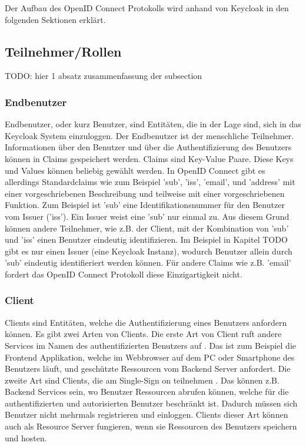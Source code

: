 Der Aufbau des OpenID Connect Protokolls wird anhand von Keycloak in den folgenden Sektionen erklärt.

\subsection{Teilnehmer/Rollen}

TODO: hier 1 absatz zusammenfassung der subsection

\subsubsection{Endbenutzer} \label{EB_End-Benutzer}

Endbenutzer, oder kurz Benutzer, sind Entitäten, die in der Lage sind, sich in das Keycloak System einzuloggen. Der Endbenutzer ist der menschliche Teilnehmer. Informationen über den Benutzer und über die Authentifizierung des Benutzers können in Claims gespeichert werden. Claims sind Key-Value Paare. Diese Keys und Values können beliebig gewählt werden. In OpenID Connect gibt es allerdings Standardclaims wie zum Beispiel 'sub', 'iss', 'email', und 'address' mit einer vorgeschriebenen Beschreibung und teilweise mit einer vorgeschriebenen Funktion. Zum Beispiel ist 'sub' eine Identifikationsnummer für den Benutzer vom Issuer ('iss'). Ein Issuer weist eine 'sub' nur einmal zu. Aus diesem Grund können andere Teilnehmer, wie z.B. der Client, mit der Kombination von 'sub' und 'iss' einen Benutzer eindeutig identifizieren. Im Beispiel in Kapitel TODO gibt es nur einen Issuer (eine Keycloak Instanz), wodurch Benutzer allein durch 'sub' eindeutig identifieriert werden können. Für andere Claims wie z.B. 'email' fordert das OpenID Connect Protokoll diese Einzigartigkeit nicht.

\subsubsection{Client} \label{EB_Client}

Clients sind Entitäten, welche die Authentifizierung eines Benutzers anfordern können. Es gibt zwei Arten von Clients. Die erste Art von Client ruft andere Services im Namen des authentifizierten Benutzers auf \cite{EB2} \cite{EB3}. Das ist zum Beispiel die Frontend Applikation, welche im Webbrowser auf dem PC oder Smartphone des Benutzers läuft, und geschützte Ressourcen vom Backend Server anfordert. Die zweite Art sind Clients, die am Single-Sign on teilnehmen \cite{EB3}. Das können z.B. Backend Services sein, wo Benutzer Ressourcen abrufen können, welche für die authentifizierten und autorisierten Benutzer beschränkt ist. Dadurch müssen sich Benutzer nicht mehrmals registrieren und einloggen. Clients dieser Art können auch als Resource Server fungieren, wenn sie Ressourcen des Benutzers speichern und hosten.

